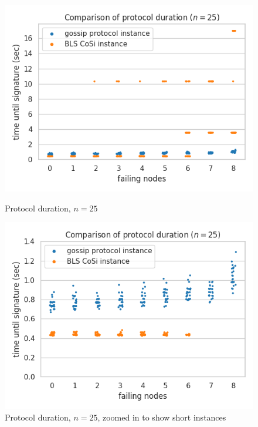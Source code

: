 \begin{figure}[H]
    \centering
    \begin{minipage}{0.5\textwidth}
        \centering
        \includegraphics[width=\textwidth]{figures/1/round_wall_sum_25.png}
        \captionsetup{labelformat=empty}
        \caption{Protocol duration, $n = 25$}
    \end{minipage}\hfill
    \begin{minipage}{0.5\textwidth}
        \centering
        \includegraphics[width=\textwidth]{figures/1/round_wall_sum_zoomed_25.png}
        \captionsetup{labelformat=empty}
        \caption{Protocol duration, $n = 25$, zoomed in to show short instances}
    \end{minipage}\hfill
\end{figure}

